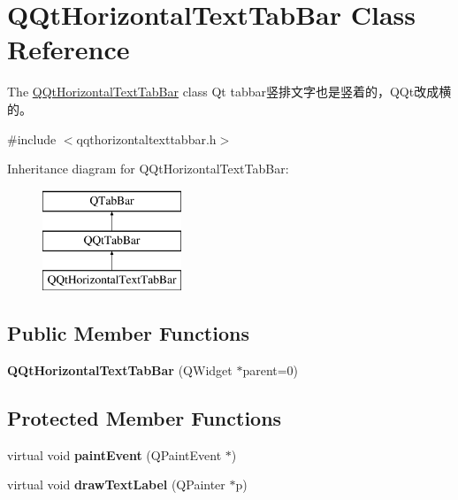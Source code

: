 \hypertarget{class_q_qt_horizontal_text_tab_bar}{}\section{Q\+Qt\+Horizontal\+Text\+Tab\+Bar Class Reference}
\label{class_q_qt_horizontal_text_tab_bar}


The \mbox{\hyperlink{class_q_qt_horizontal_text_tab_bar}{Q\+Qt\+Horizontal\+Text\+Tab\+Bar}} class Qt tabbar竖排文字也是竖着的，\+Q\+Qt改成横的。  




{\ttfamily \#include $<$qqthorizontaltexttabbar.\+h$>$}

Inheritance diagram for Q\+Qt\+Horizontal\+Text\+Tab\+Bar\+:\begin{figure}[H]
\begin{center}
\leavevmode
\includegraphics[height=3.000000cm]{class_q_qt_horizontal_text_tab_bar}
\end{center}
\end{figure}
\subsection*{Public Member Functions}
\begin{DoxyCompactItemize}
\item 
\mbox{\label{class_q_qt_horizontal_text_tab_bar_ab7e2b60ed54af49263e77949217ef3d0}} 
{\bfseries Q\+Qt\+Horizontal\+Text\+Tab\+Bar} (Q\+Widget $\ast$parent=0)
\end{DoxyCompactItemize}
\subsection*{Protected Member Functions}
\begin{DoxyCompactItemize}
\item 
\mbox{\label{class_q_qt_horizontal_text_tab_bar_aa650a449e182631c58612cf98e05275f}} 
virtual void {\bfseries paint\+Event} (Q\+Paint\+Event $\ast$)
\item 
\mbox{\label{class_q_qt_horizontal_text_tab_bar_a7db9953b5c095c6dd6d3ee57881b26b1}} 
virtual void {\bfseries draw\+Text\+Label} (Q\+Painter $\ast$p)
\end{DoxyCompactItemize}


